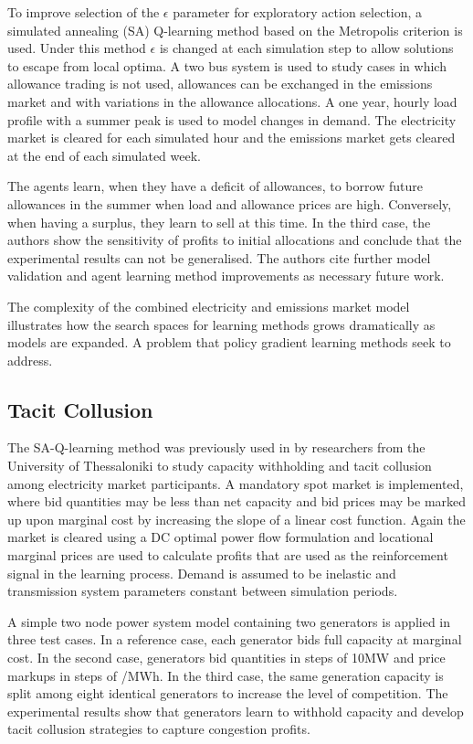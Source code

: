 To improve selection of the $\epsilon$ parameter for exploratory
action selection, a simulated annealing (SA) Q-learning method based on the
Metropolis criterion \cite{guo:sa} is used.  Under this method $\epsilon$ is
changed at each simulation step to allow solutions to escape from local
optima.  A two bus system is used to study cases in which allowance trading
is not used, allowances can be exchanged in the emissions market and with
variations in the allowance allocations.  A one year, hourly load profile with
a summer peak is used to model changes in demand.  The electricity market is
cleared for each simulated hour and the emissions market gets cleared at the
end of each simulated week.

The agents learn, when they have a deficit of allowances, to borrow future
allowances in the summer when load and allowance prices are high.  Conversely,
when having a surplus, they learn to sell at this time.  In the third case, the
authors show the sensitivity of profits to initial allocations and conclude
that the experimental results can not be generalised.  The authors cite
further model validation and agent learning method improvements as necessary
future work.

The complexity of the combined electricity and emissions market model
illustrates how the search spaces for learning methods grows dramatically as
models are expanded.  A problem that policy gradient learning methods
seek to address.

\subsection{Tacit Collusion}
The SA-Q-learning method was previously used in  by
researchers from the University of Thessaloniki to study capacity withholding
and tacit collusion among electricity market participants.  A mandatory spot
market is implemented, where bid quantities may be less than net capacity and
bid prices may be marked up upon marginal cost by increasing the slope of a
linear cost function.  Again the market is cleared using a DC
optimal power flow formulation and locational marginal prices are used to
calculate profits that are used as the reinforcement signal in the learning
process.  Demand is assumed to be inelastic and transmission system parameters
constant between simulation periods.

A simple two node power system model containing two generators is applied in
three test cases. In a reference case, each generator bids full capacity at
marginal cost.  In the second case, generators bid quantities in steps of 10MW
and price markups in steps of /MWh.  In the third case, the same
generation capacity is split among eight identical generators to increase the
level of competition. The experimental results show that generators learn to
withhold capacity and develop tacit collusion strategies to capture
congestion profits.

